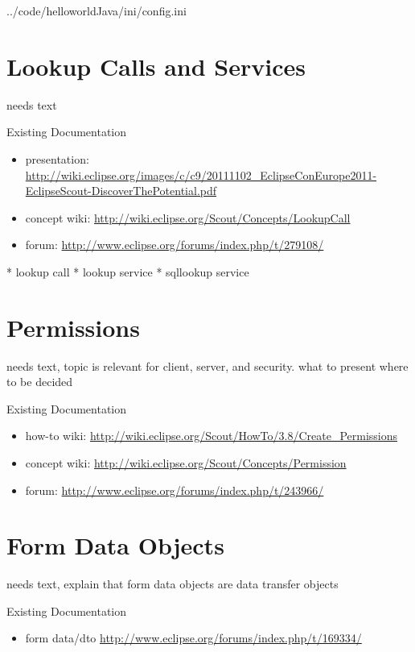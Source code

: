 \documentclass[a4paper,10pt,twoside]{book}
\begin{document}

{../code/helloworldJava/ini/config.ini}

\section{Lookup Calls and Services}
needs text
 
\noindent Existing Documentation
\begin{itemize}
  \item presentation: \url{http://wiki.eclipse.org/images/c/c9/20111102_EclipseConEurope2011-EclipseScout-DiscoverThePotential.pdf}
  \item concept wiki: \url{http://wiki.eclipse.org/Scout/Concepts/LookupCall}
  \item forum: \url{http://www.eclipse.org/forums/index.php/t/279108/}
\end{itemize}

    * lookup call
  * lookup service
  * sqllookup service

\section{Permissions}

needs text, topic is relevant for client, server, and security. what to present where to be decided

\noindent Existing Documentation
\begin{itemize}
  \item how-to wiki: \url{http://wiki.eclipse.org/Scout/HowTo/3.8/Create_Permissions}
  \item concept wiki: \url{http://wiki.eclipse.org/Scout/Concepts/Permission}
  \item forum: \url{http://www.eclipse.org/forums/index.php/t/243966/}
\end{itemize}

\section{Form Data Objects}
needs text, explain that form data objects are data transfer objects

\noindent Existing Documentation
\begin{itemize}
  \item form data/dto \url{http://www.eclipse.org/forums/index.php/t/169334/}
\end{itemize}
\end{document}

